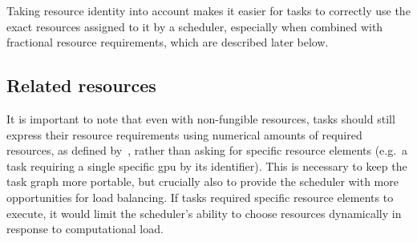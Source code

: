 
Taking resource identity into account makes it easier for tasks to correctly use the exact
resources assigned to it by a scheduler, especially when combined with fractional resource
requirements, which are described later below.

\subsection{Related resources}
It is important to note that even with non-fungible resources, tasks should still express their
resource requirements using numerical amounts of required resources, as defined
by~, rather than asking for specific resource elements (e.g.\ a task
requiring a single specific \gls{gpu} by its identifier). This is necessary to keep
the task graph more portable, but crucially also to provide the scheduler with more opportunities
for load balancing. If tasks required specific resource elements to execute, it would limit the
scheduler's ability to choose resources dynamically in response to computational load.

